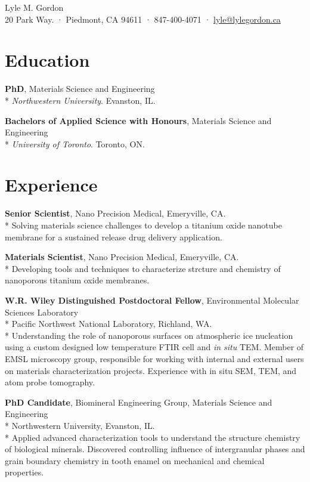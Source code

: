 \begin{center}
{\LARGE Lyle M. Gordon\\[0.3cm]}
20 Park Way. · Piedmont, CA 94611 · 847-400-4071 · \href{mailto:lyle@lylegordon.ca}{lyle@lylegordon.ca}
\end{center}

\section*{Education}
\textbf{PhD}, Materials Science and Engineering\\* 
\emph{Northwestern University}. Evanston, IL.
\begingroup\setlength{\parskip}{0.15cm}

\textbf{Bachelors of Applied Science with Honours}, Materials Science and Engineering\\* 
\emph{University of Toronto}. Toronto, ON.
\endgroup

\section*{Experience}

\textbf{Senior Scientist}, Nano Precision Medical, Emeryville, CA.\\*
\begingroup\setlength{\parskip}{0.2cm}
Solving materials science challenges to develop a titanium oxide nanotube membrane for a sustained release drug delivery application.

\textbf{Materials Scientist}, Nano Precision Medical, Emeryville, CA.\\*
Developing tools and techniques to characterize strcture and chemistry of nanoporous titanium oxide membranes.

\textbf{W.R. Wiley Distinguished Postdoctoral Fellow}, Environmental Molecular Sciences Laboratory\\* Pacific Northwest National Laboratory, Richland, WA.\\*
Understanding the role of nanoporous surfaces on atmospheric ice nucleation using a custom designed low temperature FTIR cell and \emph{in situ} TEM. Member of EMSL microscopy group, responsible for working with internal and external users on materials characterization projects. Experience with in situ SEM, TEM, and atom probe tomography.

\textbf{PhD Candidate}, Biomineral Engineering Group, Materials Science and Engineering\\* Northwestern University, Evanston, IL.\\*
Applied advanced characterization tools to understand the structure chemistry of biological minerals. Discovered controlling influence of intergranular phases and grain boundary chemistry in tooth enamel on mechanical and chemical properties.

